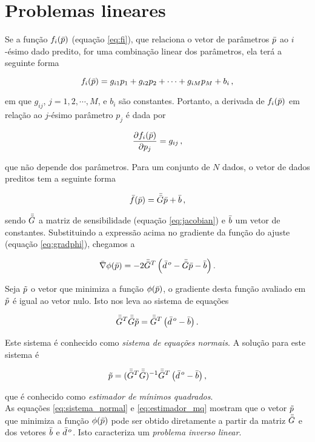 \section{Problemas lineares}

Se a função $f_i(\bar{p})$ (equação \ref{eq:fi}), que relaciona o vetor de
parâmetros $\bar{p}$ ao $i$-ésimo dado predito, for uma combinação linear dos
parâmetros, ela terá a seguinte forma

\begin{equation}
f_i(\bar{p}) = g_{i1}p_1 + g_{i2}p_2 + \dotsb + g_{iM}p_M + b_i \thinspace ,
\end{equation}

\noindent em que $g_{ij}$, $j = 1, 2, \cdots, M$, e $b_i$ são constantes.
Portanto, a derivada de $f_i(\bar{p})$ em relação ao $j$-ésimo parâmetro
$p_j$ é dada por

\begin{equation}
\dfrac{\partial f_i(\bar{p})}{\partial p_j} = g_{ij} \thinspace ,
\end{equation}

\noindent que não depende dos parâmetros. Para um conjunto de $N$ dados, o vetor
de dados preditos tem a seguinte forma

\begin{equation}
\bar{f}(\bar{p}) = \bar{\bar{G}}\bar{p} + \bar{b} \thinspace ,
\end{equation}

\noindent sendo $\bar{\bar{G}}$ a matriz de sensibilidade (equação \ref{eq:jacobian})
e $\bar{b}$ um vetor de constantes.
Substituindo a expressão acima no gradiente da função do ajuste (equação
\ref{eq:gradphi}), chegamos a

\begin{equation}
\bar{\nabla}\phi(\bar{p}) = -2\bar{\bar{G}}^T \left(\bar{d}^{\thinspace o} -
    \bar{\bar{G}}\bar{p} - \bar{b} \right).
\end{equation}

\indent Seja $\tilde{p}$ o vetor que minimiza a função $\phi(\bar{p})$, o
gradiente desta função avaliado em $\tilde{p}$ é igual ao vetor nulo.
Isto nos leva ao sistema de equações

\begin{equation}
\bar{\bar{G}}^T\bar{\bar{G}}\tilde{p} = \bar{\bar{G}}^T\left(\bar{d}^{\thinspace o} - \bar{b} \right).
\label{eq:sistema_normal}
\end{equation}

\noindent Este sistema é conhecido como {\it sistema de equações normais}. A
solução para este sistema é

\begin{equation}
\tilde{p} = (\bar{\bar{G}}^T\bar{\bar{G}})^{-1} \bar{\bar{G}}^T
    \left(\bar{d}^{\thinspace o} - \bar{b} \right),
\label{eq:estimador_mq}
\end{equation}

\noindent que é conhecido como {\it estimador de mínimos quadrados}.
\\
\indent As equações \ref{eq:sistema_normal} e \ref{eq:estimador_mq} mostram que 
o vetor $\tilde{p}$ que minimiza a função $\phi(\bar{p})$ pode ser
obtido diretamente a partir da matriz $\bar{\bar{G}}$ e dos vetores $\bar{b}$ e
$\bar{d}^{\thinspace o}$. Isto caracteriza um {\it problema inverso linear}.
